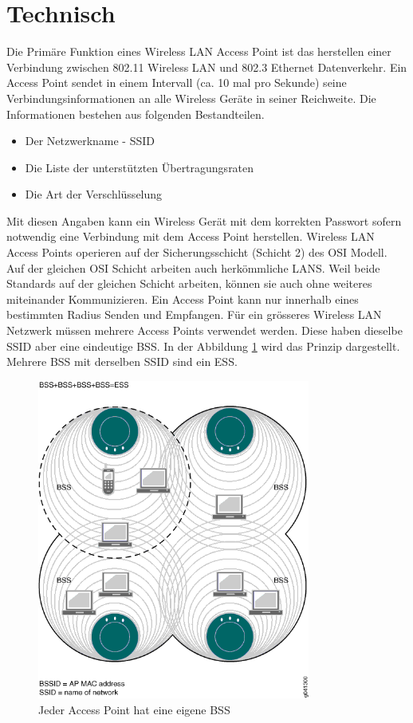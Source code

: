 \section{Technisch}
Die Primäre Funktion eines Wireless LAN Access Point ist das herstellen einer Verbindung zwischen 802.11 Wireless LAN und 802.3 Ethernet Datenverkehr. Ein Access Point sendet in einem Intervall (ca. 10 mal pro Sekunde) seine Verbindungsinformationen an alle Wireless Geräte in seiner Reichweite. Die Informationen bestehen aus folgenden Bestandteilen.
\begin{itemize}
\item Der Netzwerkname - SSID
\item Die Liste der unterstützten Übertragungsraten
\item Die Art der Verschlüsselung
\end{itemize}
Mit diesen Angaben kann ein Wireless Gerät mit dem korrekten Passwort sofern notwendig eine Verbindung mit dem Access Point herstellen. Wireless LAN Access Points operieren auf der Sicherungsschicht (Schicht 2) des OSI Modell. Auf der gleichen OSI Schicht arbeiten auch herkömmliche LANS. Weil beide Standards auf der gleichen Schicht arbeiten, können sie auch ohne weiteres miteinander Kommunizieren. \newline{}
Ein Access Point kann nur innerhalb eines bestimmten Radius Senden und Empfangen. Für ein grösseres Wireless LAN Netzwerk müssen mehrere Access Points verwendet werden. Diese haben dieselbe SSID aber eine eindeutige BSS. In der Abbildung \ref{fig:bssap} wird das Prinzip dargestellt. Mehrere BSS mit derselben SSID sind ein ESS.
\begin{figure}[ht]
	\centering
	\includegraphics[width=0.8\textwidth]{images/bssssid.png}
	\caption{Jeder Access Point hat eine eigene BSS}
	\label{fig:bssap}
\end{figure}


